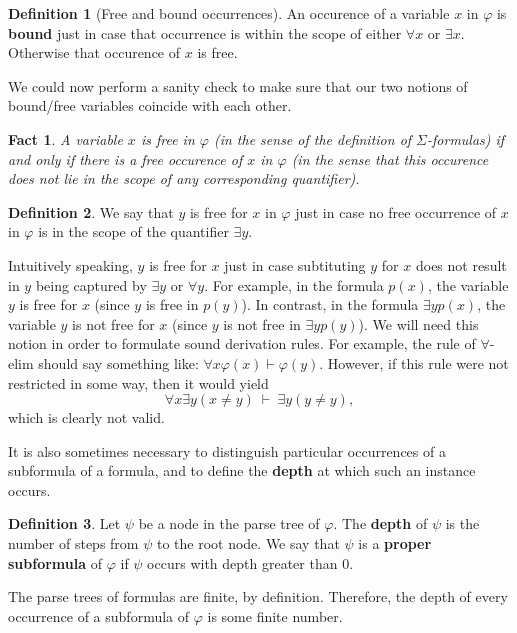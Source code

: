 \documentclass[11pt,fleqn]{article}
\newtheorem{fact}[prop]{Fact}
\theoremstyle{definition}
\newtheorem*{defn}{Definition}
\theoremstyle{remark}
\newcommand{\2}{\mathscr}
\newcommand{\vp}{\varphi}
\begin{document}
\begin{defn}[Free and bound occurrences] An occurence of a variable
  $x$ in $\vp$ is \textbf{bound} just in case that occurrence is
  within the scope of either $\forall x$ or $\exists x$.  Otherwise
  that occurence of $x$ is free. \end{defn}

We could now perform a sanity check to make sure that our two notions
of bound/free variables coincide with each other.

\begin{fact} A variable $x$ is free in $\vp$ (in the sense of the
  definition of $\Sigma$-formulas) if and only if there is a free
  occurence of $x$ in $\vp$ (in the sense that this occurence does not
  lie in the scope of any corresponding quantifier).  \end{fact}

\begin{defn} We say that $y$ is free for $x$ in $\vp$ just in case no
  free occurrence of $x$ in $\vp$ is in the scope of the quantifier
  $\exists y$.  \end{defn}

Intuitively speaking, $y$ is free for $x$ just in case subtituting $y$
for $x$ does not result in $y$ being captured by $\exists y$ or
$\forall y$.  For example, in the formula $p(x)$, the variable $y$ is
free for $x$ (since $y$ is free in $p(y)$).  In contrast, in the
formula $\exists yp(x)$, the variable $y$ is not free for $x$ (since
$y$ is not free in $\exists yp(y)$).  We will need this notion in
order to formulate sound derivation rules.  For example, the rule of
$\forall$-elim should say something like:
$\forall x\vp (x)\vdash \vp (y)$.  However, if this rule were not
restricted in some way, then it would yield
\[ \forall x\exists y(x\neq y) \: \vdash \: \exists y(y\neq y) ,\]
which is clearly not valid.

It is also sometimes necessary to distinguish particular occurrences
of a subformula of a formula, and to define the \textbf{depth} at
which such an instance occurs.

\begin{defn} Let $\psi$ be a node in the parse tree of $\vp$.  The
  \textbf{depth} of $\psi$ is the number of steps from $\psi$ to the
  root node.  We say that $\psi$ is a \textbf{proper subformula} of
  $\vp$ if $\psi$ occurs with depth greater than $0$. \end{defn}

The parse trees of formulas are finite, by definition.  Therefore, the
depth of every occurrence of a subformula of $\vp$ is some finite
number.
\end{document}
